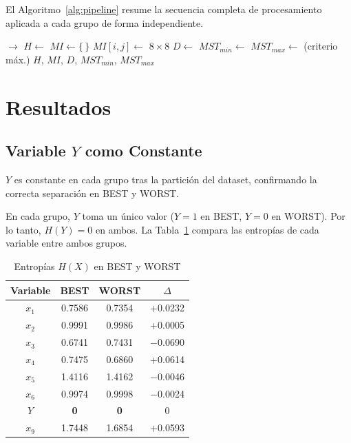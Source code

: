 \documentclass[12pt, a4paper]{article}
\begin{document}
El Algoritmo~\ref{alg:pipeline} resume la secuencia completa de
procesamiento aplicada a cada grupo de forma independiente.

\begin{algorithm}[H]
\caption{Pipeline Completo de Procesamiento}\label{alg:pipeline}
\begin{algorithmic}[1]
    \State {} $\to$ 
    \State $H \gets$  
    \State $MI \gets \{\,\}$ 
        \State $MI[i,j] \gets$ 
    \EndFor
    \State {} $8 \times 8$ 
    \State $D \gets$  
    \State $MST_{min} \gets$  
    \State $MST_{max} \gets$  (criterio máx.) 
    \State \Return $H$, $MI$, $D$, $MST_{min}$, $MST_{max}$
\EndFunction
\end{algorithmic}
\end{algorithm}

\section{Resultados}

\subsection{Variable $Y$ como Constante}

\textit{} $Y$ es constante en cada grupo tras
la partición del dataset, confirmando la correcta separación en BEST
y WORST.

En cada grupo, $Y$ toma un único valor ($Y = 1$ en BEST, $Y = 0$ en WORST).
Por lo tanto, $H(Y) = 0$ en ambos. La Tabla~\ref{tab:entropy} compara las
entropías de cada variable entre ambos grupos.

\begin{table}[H]
    \centering
    \caption{Entropías $H(X)$ en BEST y WORST}
    \label{tab:entropy}
    \small
    \begin{tabular}{cccc}
    \toprule
    Variable & BEST & WORST & $\Delta$ \\
    \midrule
    $x_1$ & 0.7586 & 0.7354 & +0.0232 \\
    $x_2$ & 0.9991 & 0.9986 & +0.0005 \\
    $x_3$ & 0.6741 & 0.7431 & $-$0.0690 \\
    $x_4$ & 0.7475 & 0.6860 & +0.0614 \\
    $x_5$ & 1.4116 & 1.4162 & $-$0.0046 \\
    $x_6$ & 0.9974 & 0.9998 & $-$0.0024 \\
    $Y$   & \textbf{0} & \textbf{0} & 0 \\
    $x_9$ & 1.7448 & 1.6854 & +0.0593 \\
    \bottomrule
    \end{tabular}
\end{table}
\end{document}
